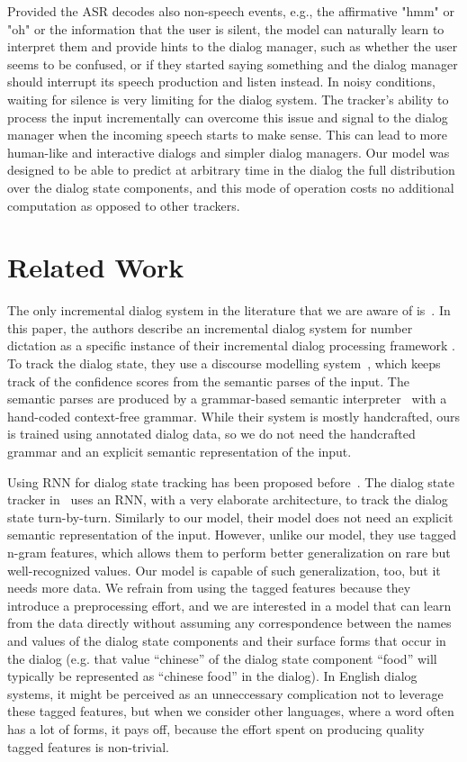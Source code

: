 \documentclass[11pt,twocolumn]{article}
\begin{document}
Provided the ASR decodes also non-speech events, e.g., the affirmative "hmm" or "oh" or the information that the user is silent, the model can naturally learn to interpret them and provide hints to the dialog manager, such as whether the user seems to be confused, or if they started saying something and the dialog manager should interrupt its speech production and listen instead. In noisy conditions, waiting for silence is very limiting for the dialog system. The tracker's ability to process the input incrementally can overcome this issue and signal to the dialog manager when the incoming speech starts to make sense. This can lead to more human-like and interactive dialogs and simpler dialog managers. Our model was designed to be able to predict at arbitrary time in the dialog the full distribution over the dialog state components, and this mode of operation costs no additional computation as opposed to other trackers.

\section{Related Work}
\label{sec:related}

The only incremental dialog system in the literature that we are aware of is~\cite{skantze2009incremental}. In this paper, the authors describe an incremental dialog system for number dictation as a specific instance of their incremental dialog processing framework \cite{schlangen2009general}. To track the dialog state, they use a discourse modelling system~\cite{skantze2008galatea}, which keeps track of the confidence scores from the semantic parses of the input. The semantic parses are produced by a grammar-based semantic interpreter~\cite{skantze2004robust} with a hand-coded context-free grammar. While their system is mostly handcrafted, ours is trained using annotated dialog data, so we do not need the handcrafted grammar and an explicit semantic representation of the input.

Using RNN for dialog state tracking has been proposed before~\cite{henderson2014word,henderson2013deep}. The dialog state tracker in~\cite{henderson2014word} uses an RNN, with a very elaborate architecture, to track the dialog state turn-by-turn. Similarly to our model, their model does not need an explicit semantic representation of the input. However, unlike our model, they use tagged n-gram features, which allows them to perform better generalization on rare but well-recognized values. Our model is capable of such generalization, too, but it needs more data. We refrain from using the tagged features because they introduce a preprocessing effort, and we are interested in a model that can learn from the data directly without assuming any correspondence between the names and values of the dialog state components and their surface forms that occur in the dialog (e.g. that value ``chinese'' of the dialog state component ``food'' will typically be represented as ``chinese food'' in the dialog). In English dialog systems, it might be perceived as an unneccessary complication not to leverage these tagged features, but when we consider other languages, where a word often has a lot of forms, it pays off, because the effort spent on producing quality tagged features is non-trivial.
\end{document}
